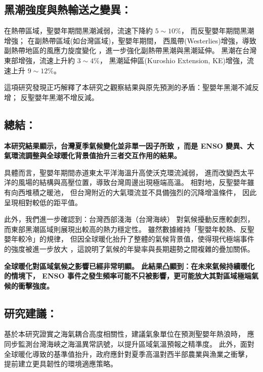 \documentclass[UTF8, fontset=none,12pt]{ctexart}
\begin{document}
\subsection*{黑潮強度與熱輸送之變異：}
在熱帶區域，聖嬰年期間黑潮減弱，流速下降約 $5\sim 10\%$，
而反聖嬰年期間黑潮增強；
在副熱帶區域(如台灣區域)，聖嬰年期間，
西風帶(Westerlies)增強，導致副熱帶地區的風應力旋度變化
，進一步強化副熱帶黑潮與黑潮延伸。
黑潮在台灣東部增強，流速上升約 $3\sim 4\%$，
黑潮延伸區(Kuroshio Extension, KE)增強，流速上升 $9\sim 12\%$。

這項研究發現正巧解釋了本研究之觀察結果與原先預測的矛盾：聖嬰年黑潮不減反增；
反聖嬰年黑潮不增反減。
\subsection*{總結：}
\textbf{本研究結果顯示，台灣夏季氣候變化並非單一因子所致
，而是 ENSO 變異、大氣環流調整與全球暖化背景值抬升三者交互作用的結果。} 

具體而言，聖嬰年期間赤道東太平洋海溫升高使沃克環流減弱，
進而改變西太平洋的風場的結構與高壓位置，導致台灣周邊出現極端高溫。
相對地，反聖嬰年雖有向西堆積之暖池，
但台灣附近的大氣環流並不具備強烈的沉降增溫條件，
因此呈現相對較低的距平值。

此外，我們進一步確認到：台灣西部淺海（台灣海峽）
對氣候擾動反應較劇烈，而東部黑潮區域則展現出較高的熱力穩定性。
雖然數據維持「聖嬰年較熱、反聖嬰年較冷」的規律，
但因全球暖化抬升了整體的氣候背景值，使得現代極端事件的強度被進一步放大
，這說明了氣候的年變率與長期趨勢之間複雜的疊加關係。

{\bfseries \selectfont
全球暖化對區域氣候之影響已經非常明顯。
此結果凸顯到：在未來氣候持續暖化的情境下，
ENSO 事件之發生頻率可能不只被影響，更可能放大其對區域極端氣候的衝擊強度。
}
\subsection*{研究建議：}
基於本研究證實之海氣耦合高度相關性，建議氣象單位在預測聖嬰年熱浪時，
應同步監測台灣海峽之海溫異常訊號，以提升區域氣溫預報之精準度。
此外，面對全球暖化導致的基準值抬升，政府應針對夏季高溫對西半部農業與漁業之衝擊，
提前建立更具韌性的環境適應策略。
\end{document}

